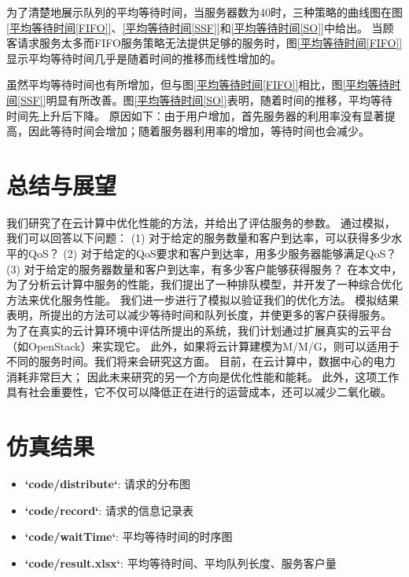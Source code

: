 \documentclass{morningstar}
\begin{document}


为了清楚地展示队列的平均等待时间，当服务器数为40时，三种策略的曲线图在图\ref{平均等待时间[FIFO]}、\ref{平均等待时间[SSF]}和\ref{平均等待时间[SO]}中给出。
当顾客请求服务太多而FIFO服务策略无法提供足够的服务时，图\ref{平均等待时间[FIFO]}显示平均等待时间几乎是随着时间的推移而线性增加的。
\par

虽然平均等待时间也有所增加，但与图\ref{平均等待时间[FIFO]}相比，图\ref{平均等待时间[SSF]}明显有所改善。图\ref{平均等待时间[SO]}表明，随着时间的推移，平均等待时间先上升后下降。
原因如下：由于用户增加，首先服务器的利用率没有显著提高，因此等待时间会增加；随着服务器利用率的增加，等待时间也会减少。






\clearpage
\section{总结与展望}

我们研究了在云计算中优化性能的方法，并给出了评估服务的参数。
通过模拟，我们可以回答以下问题：
(1) 对于给定的服务数量和客户到达率，可以获得多少水平的QoS？
(2) 对于给定的QoS要求和客户到达率，用多少服务器能够满足QoS？
(3) 对于给定的服务器数量和客户到达率，有多少客户能够获得服务？
在本文中，为了分析云计算中服务的性能，我们提出了一种排队模型，并开发了一种综合优化方法来优化服务性能。
我们进一步进行了模拟以验证我们的优化方法。
模拟结果表明，所提出的方法可以减少等待时间和队列长度，并使更多的客户获得服务。
为了在真实的云计算环境中评估所提出的系统，我们计划通过扩展真实的云平台（如OpenStack）来实现它。
此外，如果将云计算建模为M/M/G，则可以适用于不同的服务时间。我们将来会研究这方面。
目前，在云计算中，数据中心的电力消耗非常巨大；
因此未来研究的另一个方向是优化性能和能耗。
此外，这项工作具有社会重要性，它不仅可以降低正在进行的运营成本，还可以减少二氧化碳。


\vspace{1em}


\startappendix

\section{仿真结果}
\begin{itemize}
    \item \textbf{`code/distribute`}: 请求的分布图
    \item \textbf{`code/record`}: 请求的信息记录表
    \item \textbf{`code/waitTime`}: 平均等待时间的时序图
    \item \textbf{`code/result.xlsx`}: 平均等待时间、平均队列长度、服务客户量
\end{itemize}
\end{document}
